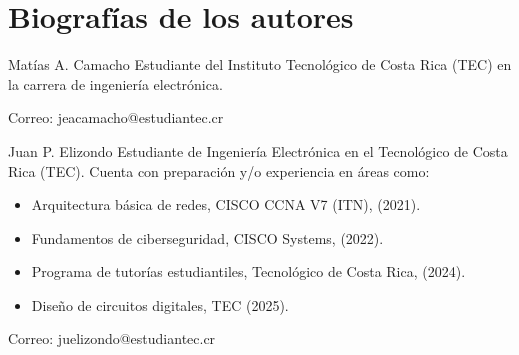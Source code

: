 \documentclass[journal]{IEEEtran}
\begin{document}


\printbibliography




\vspace{3cm}
\section{Biografías de los autores}
 
\begin{IEEEbiographynophoto}{Matías A. Camacho}
        Estudiante del Instituto Tecnológico de Costa Rica (TEC) en la carrera de ingeniería electrónica.
        
        Correo: jeacamacho@estudiantec.cr
\end{IEEEbiographynophoto}

\begin{IEEEbiographynophoto}{Juan P. Elizondo}
        Estudiante de Ingeniería Electrónica en el Tecnológico de Costa Rica (TEC).
        Cuenta con preparación y/o experiencia en áreas como:
        \begin{itemize}
            \item Arquitectura básica de redes, CISCO CCNA V7 (ITN), (2021).
            \item Fundamentos de ciberseguridad, CISCO Systems, (2022).
            \item Programa de tutorías estudiantiles, Tecnológico de Costa Rica, (2024).
            \item Diseño de circuitos digitales, TEC (2025).
        \end{itemize}
        
        Correo: juelizondo@estudiantec.cr
\end{IEEEbiographynophoto}


\vfill
\end{document}
